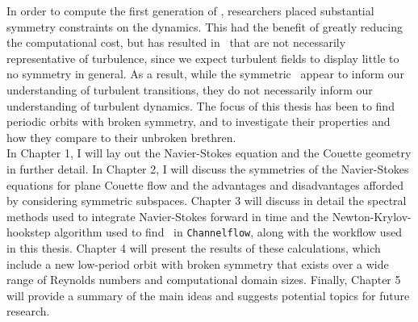  In order to compute the first generation of \ecs, researchers placed substantial symmetry constraints on the dynamics. This had the benefit of greatly reducing the computational cost, but has resulted in \ecs\ that are not necessarily representative of turbulence, since we expect turbulent fields to display little to no symmetry in general. As a result, while the symmetric \ecs\ 	appear to inform our understanding of turbulent transitions, they do not necessarily inform our understanding of turbulent dynamics. The focus of this thesis has been to find periodic orbits with broken symmetry, and to investigate their properties and how they compare to their unbroken brethren.\\ 
 




In Chapter 1, I will lay out the Navier-Stokes equation and the Couette geometry  in further detail. In Chapter 2, I will discuss the symmetries of the Navier-Stokes equations for plane Couette flow and the advantages and disadvantages afforded by considering symmetric subspaces. Chapter 3 will discuss in detail the spectral methods used to integrate Navier-Stokes forward in time and the Newton-Krylov-hookstep algorithm used to find \ecs\ in {\tt Channelflow}, along with the workflow used in this thesis. Chapter 4 will present the results of these calculations, which include a new low-period orbit with broken symmetry that exists over a wide range of Reynolds numbers and computational domain sizes. Finally, Chapter 5 will provide a summary of the main ideas and suggests potential topics for future research. 
 
 
 
 
 